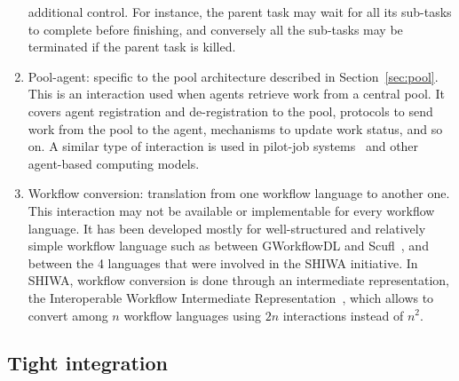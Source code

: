 \documentclass[preprint,3p,twocolumn]{elsarticle}
\begin{document}
\begin{enumerate}[leftmargin=0cm,itemindent=0.65cm,label=\texttt{(\alph*)}]
  additional control. For instance, the parent task may wait for all
  its sub-tasks to complete before finishing, and conversely all the
  sub-tasks may be terminated if the parent task is killed.
\item Pool-agent: specific to the pool architecture described in
  Section~\ref{sec:pool}. This is an interaction used when agents
  retrieve work from a central pool. It covers agent registration and
  de-registration to the pool, protocols to send work from the pool to
  the agent, mechanisms to update work status, and so on. A similar
  type of interaction is used in pilot-job
  systems~\cite{turilli2015comprehensive} and other agent-based
  computing models.
\item Workflow conversion: translation from one workflow language to
  another one. This interaction may not be available or implementable
  for every workflow language. It has been developed mostly for
  well-structured and relatively simple workflow language such as between GWorkflowDL
  and Scufl~\cite{OLAB-09}, and between the 4 languages that were involved in the
  SHIWA initiative. In SHIWA, workflow conversion is done through an
  intermediate representation, the Interoperable Workflow Intermediate
  Representation~\cite{plankensteiner-montagnat-etal:2011}, which
  allows to convert among $n$ workflow languages using $2n$
  interactions instead of $n^2$.
\end{enumerate}


\subsection{Tight integration}
\end{document}
